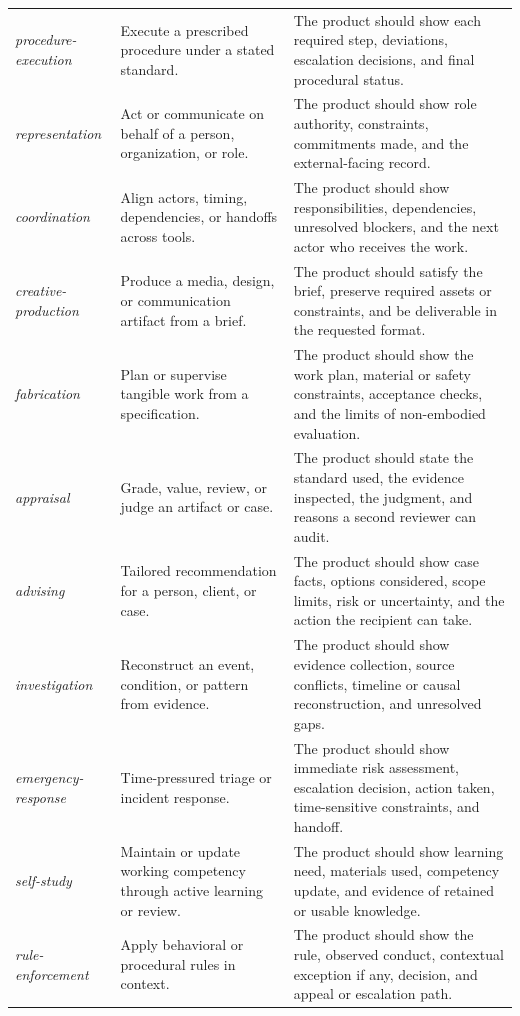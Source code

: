 \documentclass[10pt]{article}
\begin{document}
\begin{table}[!ht]
\begin{tabularx}{\linewidth}{lXX}
\emph{procedure-execution} & Execute a prescribed procedure under a stated standard. & The product should show each required step, deviations, escalation decisions, and final procedural status. \\
\emph{representation} & Act or communicate on behalf of a person, organization, or role. & The product should show role authority, constraints, commitments made, and the external-facing record. \\
\emph{coordination} & Align actors, timing, dependencies, or handoffs across tools. & The product should show responsibilities, dependencies, unresolved blockers, and the next actor who receives the work. \\
\emph{creative-production} & Produce a media, design, or communication artifact from a brief. & The product should satisfy the brief, preserve required assets or constraints, and be deliverable in the requested format. \\
\emph{fabrication} & Plan or supervise tangible work from a specification. & The product should show the work plan, material or safety constraints, acceptance checks, and the limits of non-embodied evaluation. \\
\emph{appraisal} & Grade, value, review, or judge an artifact or case. & The product should state the standard used, the evidence inspected, the judgment, and reasons a second reviewer can audit. \\
\emph{advising} & Tailored recommendation for a person, client, or case. & The product should show case facts, options considered, scope limits, risk or uncertainty, and the action the recipient can take. \\
\emph{investigation} & Reconstruct an event, condition, or pattern from evidence. & The product should show evidence collection, source conflicts, timeline or causal reconstruction, and unresolved gaps. \\
\emph{emergency-response} & Time-pressured triage or incident response. & The product should show immediate risk assessment, escalation decision, action taken, time-sensitive constraints, and handoff. \\
\emph{self-study} & Maintain or update working competency through active learning or review. & The product should show learning need, materials used, competency update, and evidence of retained or usable knowledge. \\
\emph{rule-enforcement} & Apply behavioral or procedural rules in context. & The product should show the rule, observed conduct, contextual exception if any, decision, and appeal or escalation path. \\
\bottomrule
\end{tabularx}
\end{table}
\FloatBarrier
\end{document}

